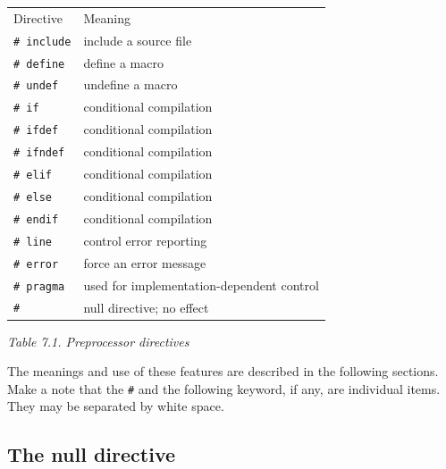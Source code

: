   \begin{tabular}{lp{\textwidth}}
    Directive & Meaning
   \\

    \texttt{\# include} & include a source file
   \\

    \texttt{\# define} & define a macro
   \\

    \texttt{\# undef} & undefine a macro
   \\

    \texttt{\# if} & conditional compilation
   \\

    \texttt{\# ifdef} & conditional compilation
   \\

    \texttt{\# ifndef} & conditional compilation
   \\

    \texttt{\# elif} & conditional compilation
   \\

    \texttt{\# else} & conditional compilation
   \\

    \texttt{\# endif} & conditional compilation
   \\

    \texttt{\# line} & control error reporting
   \\

    \texttt{\# error} & force an error message
   \\

    \texttt{\# pragma} & used for implementation-dependent control
   \\

    \texttt{\#} & null directive; no effect
   \\
\end{tabular}

\begin{center}\textit{Table 7.1. Preprocessor directives}\end{center}


  The meanings and use of these features are described in the following
   sections. Make a note that the \texttt{\#} and the following keyword,
   if any, are individual items. They may be separated by white space.


  \subsection{The null directive}
   

